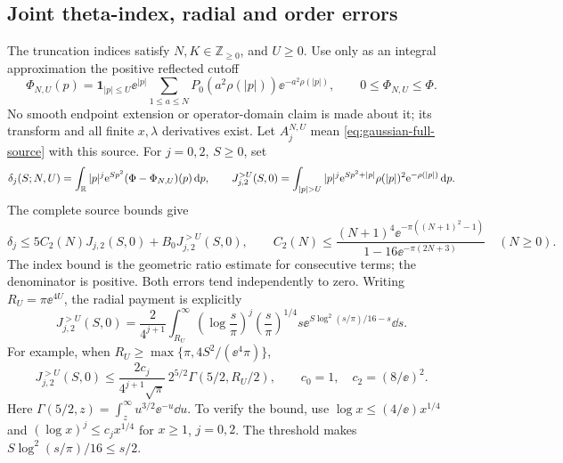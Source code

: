 \subsection{Joint theta-index, radial and order errors}
The truncation indices satisfy \(N,K\in\mathbb Z_{\ge0}\), and \(U\ge0\).
Use only as an integral approximation the positive reflected cutoff
\begin{equation}\label{eq:gaussian-source-cutoff}
 \Phi_{N,U}(p)=\boldsymbol1_{|p|\le U}\ee^{|p|}
 \sum_{1\le a\le N}P_0(a^2\rho(|p|))\ee^{-a^2\rho(|p|)},
 \qquad0\le\Phi_{N,U}\le\Phi.
\end{equation}
No smooth endpoint extension or operator-domain claim is made about it;
its transform and all finite \(x,\lambda\) derivatives exist. Let
\(A_j^{N,U}\) mean \eqref{eq:gaussian-full-source} with this source.
For \(j=0,2\), \(S\ge0\), set
\[
 \delta_j(S;N,U)=\int_\R|p|^j\ee^{Sp^2}(\Phi-\Phi_{N,U})(p)\dd p,
 \qquad J^{>U}_{j,2}(S,0)=\int_{|p|>U}|p|^j
     \ee^{Sp^2+|p|}\rho(|p|)^2\ee^{-\rho(|p|)}\dd p.
\]
The complete source bounds give
\begin{equation}\label{eq:gaussian-source-tail}
 \delta_j\le5C_2(N)J_{j,2}(S,0)+B_0J^{>U}_{j,2}(S,0),\qquad
 C_2(N)\le\frac{(N+1)^4\ee^{-\pi((N+1)^2-1)}}
                    {1-16\ee^{-\pi(2N+3)}}\quad(N\ge0).
\end{equation}
The index bound is the geometric ratio estimate for consecutive terms;
the denominator is positive. Both errors tend independently to zero.
Writing \(R_U=\pi\ee^{4U}\), the radial payment is explicitly
\begin{equation}\label{eq:gaussian-radial-tail}
 J^{>U}_{j,2}(S,0)=\frac{2}{4^{j+1}}\int_{R_U}^\infty
 \left(\log\frac{s}{\pi}\right)^j
 \left(\frac{s}{\pi}\right)^{1/4}s
 \ee^{S\log^2(s/\pi)/16-s}\dd s.
\end{equation}
For example, when \(R_U\ge\max\{\pi,4S^2/(\ee^4\pi)\}\),
\begin{equation}\label{eq:gaussian-gamma-tail}
 J^{>U}_{j,2}(S,0)\le
 \frac{2c_j}{4^{j+1}\sqrt\pi}\,2^{5/2}\Gamma(5/2,R_U/2),
 \qquad c_0=1,\quad c_2=(8/\ee)^2.
\end{equation}
Here \(\Gamma(5/2,z)=\int_z^\infty u^{3/2}\ee^{-u}\dd u\).
To verify the bound, use \(\log x\le(4/\ee)x^{1/4}\) and
\((\log x)^j\le c_jx^{1/4}\) for \(x\ge1\), \(j=0,2\).
The threshold makes \(S\log^2(s/\pi)/16\le s/2\).

